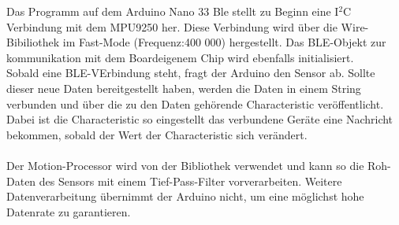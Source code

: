 Das Programm auf dem Arduino Nano 33 Ble stellt zu Beginn eine 
I$^2$C Verbindung mit dem MPU9250 her. Diese Verbindung wird über
die Wire-Bibiliothek im Fast-Mode (Frequenz:400 000) hergestellt. 
Das BLE-Objekt zur kommunikation
mit dem Boardeigenem Chip wird ebenfalls initialisiert. \\
Sobald eine BLE-VErbindung steht, fragt der Arduino
den Sensor ab. Sollte dieser neue Daten 
bereitgestellt haben, werden die Daten in einem String 
verbunden und über die zu den Daten gehörende Characteristic 
veröffentlicht. Dabei ist die Characteristic so eingestellt das 
verbundene Geräte eine Nachricht bekommen, sobald der Wert 
der Characteristic sich verändert.\\
\\
Der Motion-Processor wird von der Bibliothek verwendet und 
kann so die Roh-Daten des Sensors mit einem Tief-Pass-Filter
vorverarbeiten. Weitere Datenverarbeitung übernimmt der 
Arduino nicht, um eine möglichst hohe Datenrate zu garantieren.